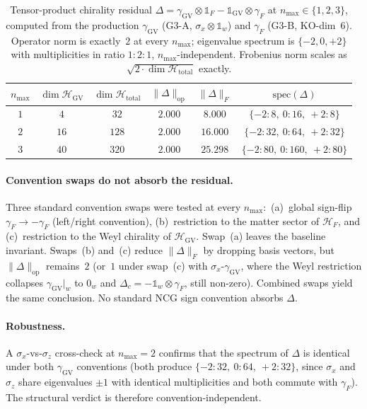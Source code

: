 \documentclass[11pt]{article}
\begin{document}
\begin{table}[h]
\centering
\small
\begin{tabular}{|c|c|c|c|c|c|}
\hline
$n_{\max}$ & $\dim \mathcal{H}_{\mathrm{GV}}$ &
$\dim \mathcal{H}_{\mathrm{total}}$ &
$\|\Delta\|_{\mathrm{op}}$ & $\|\Delta\|_F$ &
$\mathrm{spec}(\Delta)$ \\
\hline
$1$ & $4$  & $32$  & $2.000$ & $8.000$  &
$\{-2{:}8,\ 0{:}16,\ +2{:}8\}$    \\
$2$ & $16$ & $128$ & $2.000$ & $16.000$ &
$\{-2{:}32,\ 0{:}64,\ +2{:}32\}$  \\
$3$ & $40$ & $320$ & $2.000$ & $25.298$ &
$\{-2{:}80,\ 0{:}160,\ +2{:}80\}$ \\
\hline
\end{tabular}
\caption{Tensor-product chirality residual $\Delta =
\gamma_{\mathrm{GV}} \otimes \mathbb{1}_F -
\mathbb{1}_{\mathrm{GV}} \otimes \gamma_F$ at
$n_{\max} \in \{1, 2, 3\}$, computed from the production
$\gamma_{\mathrm{GV}}$ (G3-A, $\sigma_x \otimes \mathbb{1}_w$) and
$\gamma_F$ (G3-B, KO-dim~6).  Operator norm is exactly~$2$ at every
$n_{\max}$; eigenvalue spectrum is $\{-2, 0, +2\}$ with
multiplicities in ratio $1{:}2{:}1$, $n_{\max}$-independent.
Frobenius norm scales as
$\sqrt{2 \cdot \dim \mathcal{H}_{\mathrm{total}}}$ exactly.}
\label{tab:g3c_residual}
\end{table}

\paragraph{Convention swaps do not absorb the residual.}  Three
standard convention swaps were tested at every $n_{\max}$:\
(a)~global sign-flip $\gamma_F \to -\gamma_F$ (left/right
convention), (b)~restriction to the matter sector of
$\mathcal{H}_F$, and (c)~restriction to the Weyl chirality of
$\mathcal{H}_{\mathrm{GV}}$.  Swap~(a) leaves the baseline invariant.
Swaps~(b) and~(c) reduce $\|\Delta\|_F$ by dropping basis vectors,
but $\|\Delta\|_{\mathrm{op}}$ remains~$2$ (or~$1$ under swap~(c)
with $\sigma_x$-$\gamma_{\mathrm{GV}}$, where the Weyl restriction
collapses $\gamma_{\mathrm{GV}}|_w$ to $0_w$ and $\Delta_c =
-\mathbb{1}_w \otimes \gamma_F$, still non-zero).  Combined swaps
yield the same conclusion.  No standard NCG sign convention absorbs
$\Delta$.

\paragraph{Robustness.}  A $\sigma_x$-vs-$\sigma_z$ cross-check at
$n_{\max} = 2$ confirms that the spectrum of $\Delta$ is identical
under both $\gamma_{\mathrm{GV}}$ conventions (both produce
$\{-2{:}32,\ 0{:}64,\ +2{:}32\}$, since $\sigma_x$ and $\sigma_z$
share eigenvalues $\pm 1$ with identical multiplicities and both
commute with $\gamma_F$).  The structural verdict is therefore
convention-independent.
\end{document}
